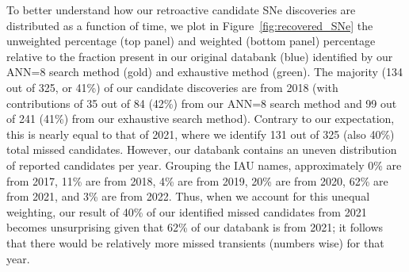\documentclass[twocolumn]{aastex63}
\begin{document}
To better understand how our retroactive candidate SNe discoveries are distributed as a function of time, we plot in Figure~\ref{fig:recovered_SNe} the unweighted percentage (top panel) and weighted (bottom panel) percentage relative to the fraction present in our original databank (blue) identified by our ANN=8 search method (gold) and exhaustive method (green). The majority (134 out of 325, or 41\%) of our candidate discoveries are from 2018 (with contributions of 35 out of 84 (42\%) from our ANN=8 search method and 99 out of 241 (41\%) from our exhaustive search method). Contrary to our expectation, this is nearly equal to that of 2021, where we identify 131 out of 325 (also 40\%) total missed candidates. However, our databank contains an uneven distribution of reported candidates per year. Grouping the IAU names, approximately 0\% are from 2017, 11\% are from 2018, 4\% are from 2019, 20\% are from 2020, 62\% are from 2021, and 3\% are from 2022. Thus, when we account for this unequal weighting, our result of 40\% of our identified missed candidates from 2021 becomes unsurprising given that 62\% of our databank is from 2021; it follows that there would be relatively more missed transients (numbers wise) for that year. \par
\end{document}
